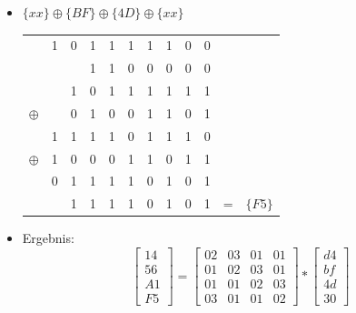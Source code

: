 \begin{itemize}
\begin{itemize}
     \end{itemize}

     \item $\{xx\} \oplus \{BF\} \oplus \{4D\} \oplus \{xx\}$
\begin{center}
\begin{tabular}{llllllllllll}
 & 1 & 0 & 1 & 1 & 1 & 1 & 1 & 0 & 0 &  & \\
 &  &  & 1 & 1 & 0 & 0 & 0 & 0 & 0 &  & \\
 &  & 1 & 0 & 1 & 1 & 1 & 1 & 1 & 1 &  & \\
$\oplus$ &  & 0 & 1 & 0 & 0 & 1 & 1 & 0 & 1 &  & \\
\hline
 & 1 & 1 & 1 & 1 & 0 & 1 & 1 & 1 & 0 &  & \\
 $\oplus$ & 1 & 0 & 0 & 0 & 1 & 1 & 0 & 1 & 1 &  & \\
 \hline
 & 0 & 1 & 1 & 1 & 1 & 0 & 1 & 0 & 1 &  &\\
 &  & 1 & 1 & 1 & 1 & 0 & 1 & 0 & 1 & = & $\{F5\}$\\
\end{tabular}
\end{center}

     \item Ergebnis:
     \begin{equation}
         \begin{bmatrix}
             14\\
             56\\
             A1\\
             F5
         \end{bmatrix}
         =
         \begin{bmatrix}
             02 & 03 & 01 & 01\\
             01 & 02 & 03 & 01\\
             01 & 01 & 02 & 03\\
             03 & 01 & 01 & 02
         \end{bmatrix}
         *
         \begin{bmatrix}
             d4\\
             bf\\
             4d\\
             30
         \end{bmatrix}
     \end{equation}

 \end{itemize}

